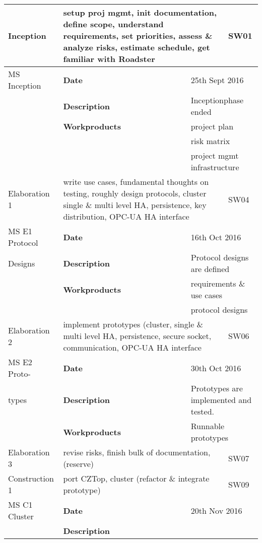 \begin{center}
\begin{longtable}{|p{25mm}|p{25mm} p{45mm}|p{10mm}|}
    \hline
    \endlastfoot
	Inception
		& \multicolumn{2}{p{70mm}|}{setup proj mgmt, init documentation, define scope, understand requirements, 
		set priorities, assess \& analyze risks, estimate schedule, get familiar with Roadster} 
		& SW01 \\ \hline
	MS Inception
		& \textbf{Date}
		& \multicolumn{2}{l|}{25th Sept 2016} \\
		& \textbf{Description}
		& \multicolumn{2}{l|}{Inceptionphase ended} \\
		& \textbf{Workproducts}
		& \multicolumn{2}{l|}{project plan} \\
		& & \multicolumn{2}{l|}{risk matrix} \\
		& & \multicolumn{2}{l|}{project mgmt infrastructure} \\ \hline
	Elaboration 1
		& \multicolumn{2}{p{70mm}|}{write use cases, fundamental thoughts on testing, roughly design protocols,
		cluster single \& multi level HA, persistence, key distribution, OPC-UA HA interface}
		& SW04 \\ \hline
	MS E1 Protocol
		& \textbf{Date}
		& \multicolumn{2}{l|}{16th Oct 2016} \\
		Designs & \textbf{Description}
		& \multicolumn{2}{l|}{Protocol designs are defined} \\
		& \textbf{Workproducts}
		& \multicolumn{2}{l|}{requirements \& use cases} \\
		& & \multicolumn{2}{l|}{protocol designs} \\ \hline
	Elaboration 2
		& \multicolumn{2}{p{70mm}|}{implement prototypes (cluster, single \& multi level HA, persistence, secure socket, 
		communication, OPC-UA HA interface}
		& SW06 \\ \hline
	MS E2 Proto-
		& \textbf{Date}
		& \multicolumn{2}{l|}{30th Oct 2016} \\
	types & \textbf{Description}
		& \multicolumn{2}{l|}{Prototypes are implemented and tested.} \\
		& \textbf{Workproducts}
		& \multicolumn{2}{l|}{Runnable prototypes} \\ \hline
	Elaboration 3
		& \multicolumn{2}{p{70mm}|}{revise risks, finish bulk of documentation, (reserve)}
		& SW07 \\ \hline
	Construction 1
		& \multicolumn{2}{p{70mm}|}{port CZTop, cluster (refactor \& integrate prototype)}
		& SW09 \\ \hline
	MS C1 Cluster
		& \textbf{Date}
		& \multicolumn{2}{l|}{20th Nov 2016} \\
		& \textbf{Description}

\end{longtable}
\end{center}
